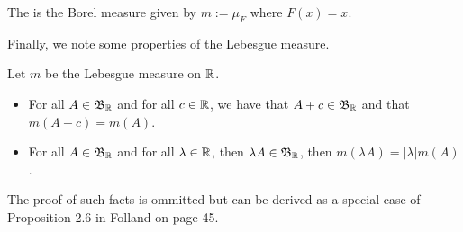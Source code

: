 \documentclass[11pt,leqno,oneside]{amsbook}
\numberwithin{thm}{section}
\begin{document}
  \begin{defn}
    The  is the Borel measure given by \(m :=
    \mu_F\) where \(F(x)=x\).
  \end{defn}
  Finally, we note some properties of the Lebesgue measure.
  \begin{prop}
    Let \(m\) be the Lebesgue measure on \({\mathbb R}\).
  \begin{itemize}
  \item For all $A \in \mathfrak{B}_{\mathbb R}$ and for all $c \in {\mathbb R}$, we have that
    $A+c \in \mathfrak{B}_{\mathbb R}$ and that $m(A+c) = m(A)$.
  \item For all $A \in \mathfrak{B}_{\mathbb R}$ and for all $\lambda \in {\mathbb R}$, then
    $\lambda A \in \mathfrak{B}_{\mathbb R}$, then $m(\lambda A) = |\lambda| m(A)$.
  \end{itemize}
  \end{prop}
  The proof of such facts is ommitted but can be derived as a special
  case of Proposition 2.6 in Folland on page 45.
\end{document}
